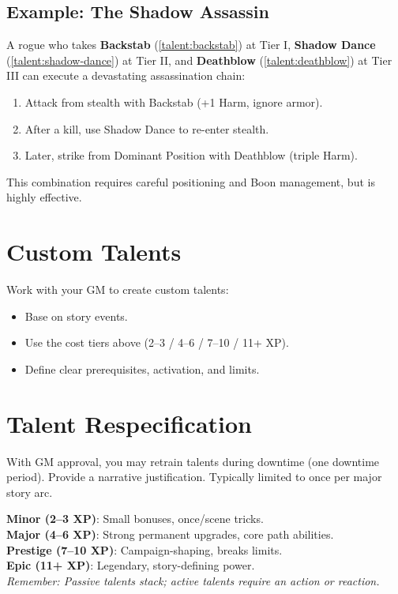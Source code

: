 \subsection*{Example: The Shadow Assassin}
\label{sec:shadow-assassin-example}
A rogue who takes \textbf{Backstab} (\ref{talent:backstab}) at Tier I, \textbf{Shadow Dance} (\ref{talent:shadow-dance}) at Tier II, and \textbf{Deathblow} (\ref{talent:deathblow}) at Tier III can execute a devastating assassination chain:
\begin{enumerate}
\item Attack from stealth with Backstab (+1 Harm, ignore armor).
\item After a kill, use Shadow Dance to re-enter stealth.
\item Later, strike from Dominant Position with Deathblow (triple Harm).
\end{enumerate}
This combination requires careful positioning and Boon management, but is highly effective.

\section{Custom Talents}
\label{sec:custom-talents}
Work with your GM to create custom talents:
\begin{itemize}
  \item Base on story events.
  \item Use the cost tiers above (2–3 / 4–6 / 7–10 / 11+ XP).
  \item Define clear prerequisites, activation, and limits.
\end{itemize}

\section{Talent Respecification}
\label{sec:talent-respec}
With GM approval, you may retrain talents during downtime (one downtime period). Provide a narrative justification. Typically limited to once per major story arc.

\begin{tcolorbox}[colback=purple!5!white,colframe=purple!75!black,title=Talent Selection Quick Reference,fonttitle=\bfseries]
\textbf{Minor (2–3 XP)}: Small bonuses, once/scene tricks. \\
\textbf{Major (4–6 XP)}: Strong permanent upgrades, core path abilities. \\
\textbf{Prestige (7–10 XP)}: Campaign-shaping, breaks limits. \\
\textbf{Epic (11+ XP)}: Legendary, story-defining power. \\[2mm]
\textit{Remember: Passive talents stack; active talents require an action or reaction.}
\end{tcolorbox}